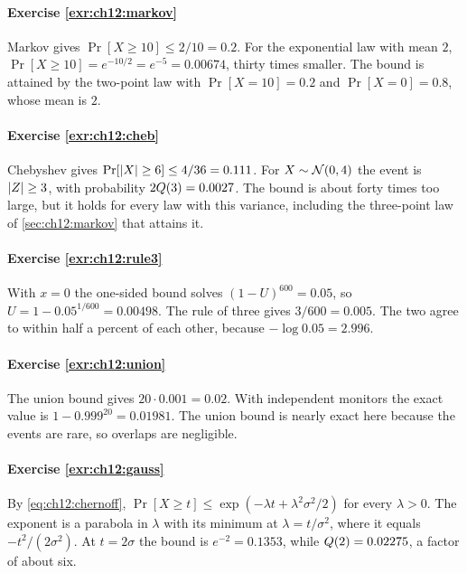 
\paragraph{Exercise \ref{exr:ch12:markov}}
Markov gives $\Pr[X\ge10]\le2/10=0.2$. For the exponential law with mean $2$, $\Pr[X\ge10]=e^{-10/2}=e^{-5}=0.00674$, thirty times smaller. The bound is attained by the two-point law with $\Pr[X=10]=0.2$ and $\Pr[X=0]=0.8$, whose mean is $2$.

\paragraph{Exercise \ref{exr:ch12:cheb}}
Chebyshev gives $\Pr[\lvert X\rvert\ge6]\le4/36=0.111$. For $X\sim\mathcal{N}(0,4)$ the event is $\lvert Z\rvert\ge3$, with probability $2Q(3)=0.0027$. The bound is about forty times too large, but it holds for every law with this variance, including the three-point law of \cref{sec:ch12:markov} that attains it.

\paragraph{Exercise \ref{exr:ch12:rule3}}
With $x=0$ the one-sided bound solves $(1-U)^{600}=0.05$, so $U=1-0.05^{1/600}=0.00498$. The rule of three gives $3/600=0.005$. The two agree to within half a percent of each other, because $-\log0.05=2.996$.

\paragraph{Exercise \ref{exr:ch12:union}}
The union bound gives $20\cdot0.001=0.02$. With independent monitors the exact value is $1-0.999^{20}=0.01981$. The union bound is nearly exact here because the events are rare, so overlaps are negligible.

\paragraph{Exercise \ref{exr:ch12:gauss}}
By \cref{eq:ch12:chernoff}, $\Pr[X\ge t]\le\exp(-\lambda t+\lambda^2\sigma^2/2)$ for every $\lambda>0$. The exponent is a parabola in $\lambda$ with its minimum at $\lambda=t/\sigma^2$, where it equals $-t^2/(2\sigma^2)$. At $t=2\sigma$ the bound is $e^{-2}=0.1353$, while $Q(2)=0.02275$, a factor of about six.

